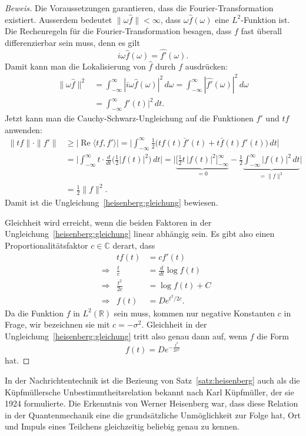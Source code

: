 \begin{proof}[Beweis]
Die Voraussetzungen garantieren, dass die Fourier-Transformation existiert.
Ausserdem bedeutet $\|\omega\hat{f}\|<\infty$, dass $\omega\hat{f}(\omega)$ 
eine $L^2$-Funktion ist.
Die Rechenregeln für die Fourier-Transformation besagen, dass 
$f$ fast überall differenzierbar sein muss, denn es gilt
\[
i\omega \hat{f}(\omega) = \widehat {f'}(\omega).
\]
Damit kann man die Lokalisierung von $\hat{f}$ durch $f$ ausdrücken:
\begin{align*}
\|\omega \hat{f}\|^2
&=
\int_{-\infty}^\infty |i\omega \hat{f}(\omega)|^2\,d\omega
=
\int_{-\infty}^\infty |\widehat{f'}(\omega)|^2\,d\omega
\\
&=
\int_{-\infty}^\infty f'(t)|^2\,dt.
\end{align*}
Jetzt kann man die Cauchy-Schwarz-Ungleichung auf die Funktionen $f'$ und $tf$
anwenden:
\begin{align*}
\|tf\| \cdot \| f'\|
&\ge
| \operatorname{Re}\langle tf,f'\rangle |
=
\biggl|
\int_{-\infty}^\infty
\frac 12\bigl( tf(t)\bar{f}'(t)  + t\bar{f}(t)f'(t)\bigr)\,dt
\biggr|
\\
&=
\biggl|
\int_{-\infty}^\infty t\cdot \frac{d}{dt}\biggl(\frac12|f(t)|^2\biggr)\,dt
\biggr|
=
\biggl|
\underbrace{
\biggl[
\frac12 t\,|f(t)|^2
\biggr]_{-\infty}^{\infty}
}_{\displaystyle=0}
-
\frac12\underbrace{\int_{-\infty}^\infty |f(t)|^2\,dt}_{\displaystyle=\|f\|^2}
\biggr|
\\
&=
\frac12 \|f\|^2.
\end{align*}
Damit ist die Ungleichung~\eqref{heisenberg:gleichung} bewiesen.

Gleichheit wird erreicht, wenn die beiden Faktoren in der 
Ungleichung~\eqref{heisenberg:gleichung} linear abhängig sein.
Es gibt also einen Proportionalitätsfaktor $c\in\mathbb C$ derart,
dass
\[
\begin{aligned}
&&
tf(t)&=cf'(t)
\\
&\Rightarrow&
\frac{t}{c}&=\frac{d}{dt}\log f(t)
\\
&\Rightarrow&
\frac{t^2}{2c}&=\log f(t) + C
\\
&\Rightarrow&
f(t)&=De^{t^2/2c}.
\end{aligned}
\]
Da die Funktion $f$ in $L^2(\mathbb R)$ sein muss, kommen nur negative
Konstanten $c$ in Frage, wir bezeichnen sie mit $c=-\sigma^2$.
Gleichheit in der Ungleichung~\eqref{heisenberg:gleichung} tritt also
genau dann auf, wenn $f$ die Form
\[
f(t) = D e^{-\frac{t^2}{2\sigma^2}}
\]
hat.
\end{proof}

In der Nachrichtentechnik ist die Bezieung von Satz~\ref{satz:heisenberg}
%
auch als die Küpfmüllersche Unbestimmtheitsrelation bekannt nach
Karl Küpfmüller, der sie 1924 formulierte.
%
Die Erkenntnis von Werner Heisenberg war, dass diese Relation in
der Quantenmechanik eine die grundsätzliche Unmöglichkeit zur Folge
hat, Ort und Impuls eines Teilchens gleichzeitig beliebig genau
zu kennen.
%

